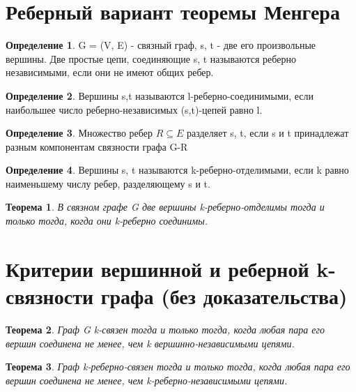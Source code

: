 \documentclass[a4paper]{article}
\newtheorem{theorem}{Теорема}[section]
\theoremstyle{definition}
\newtheorem*{definition}{Определение}
\theoremstyle{remark}
\begin{document}
\begin{multicols*}{2}
    \section{Реберный вариант теоремы Менгера}
    \begin{definition}
        G = (V, E) - связный граф, s, t - две его произвольные вершины. Две простые цепи, соединяющие s, t называются реберно независимыми, если они не имеют общих ребер.
    \end{definition}
    \begin{definition}
        Вершины s,t называются l-реберно-соединимыми, если наибольшее число реберно-независимых (s,t)-цепей равно l.
    \end{definition}
    \begin{definition}
        Множество ребер $R\subseteq E$ разделяет s, t, если s и t принадлежат разным компонентам связности графа G-R
    \end{definition}
    \begin{definition}
        Вершины s, t называются k-реберно-отделимыми, если k равно наименьшему числу ребер, разделяющему s и t.
    \end{definition}
    \begin{theorem}
        В связном графе G две вершины k-реберно-отделимы тогда и только тогда, когда они k-реберно соединимы.
    \end{theorem}
    \section{Критерии вершинной и реберной k-связности графа (без доказательства)}
    \begin{theorem}
        Граф G k-связен тогда и только тогда, когда любая пара его вершин соединена не менее, чем k вершинно-независимыми цепями.
    \end{theorem}
    \begin{theorem}
        Граф k-реберно-связен тогда и только тогда, когда любая пара его вершин соединена не менее, чем k-реберно-независимыми цепями.
    \end{theorem}

\end{multicols*}
\end{document}
